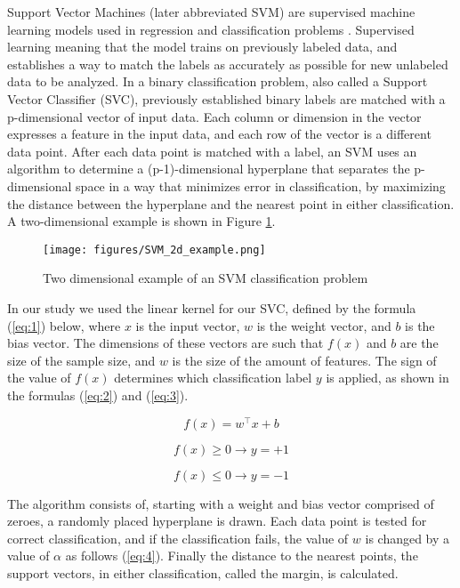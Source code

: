 \documentclass[review]{elsarticle}
\begin{document}
Support Vector Machines (later abbreviated SVM) are supervised machine learning models used in regression and classification problems \cite{35}. Supervised learning meaning that the model trains on previously labeled data, and establishes a way to match the labels as accurately as possible for new unlabeled data to be analyzed. In a binary classification problem, also called a Support Vector Classifier (SVC), previously established binary labels are matched with a p-dimensional vector of input data. Each column or dimension in the vector expresses a feature in the input data, and each row of the vector is a different data point. After each data point is matched with a label, an SVM uses an algorithm to determine a (p-1)-dimensional hyperplane that separates the p-dimensional space in a way that minimizes error in classification, by maximizing the distance between the hyperplane and the nearest point in either classification. A two-dimensional example is shown in Figure \ref{fig:svm}.

\begin{figure}
\centering
\texttt{[image: figures/SVM\_2d\_example.png]}
\caption{Two dimensional example of an SVM classification problem}
\label{fig:svm}
\end{figure}

In our study we used the linear kernel for our SVC, defined by the formula (\ref{eq:1}) below, where \(x\) is the input vector, \(w\) is the weight vector, and \(b\) is the bias vector. The dimensions of these vectors are such that \(f(x)\) and \(b\) are the size of the sample size, and \(w\) is the size of the amount of features. The sign of the value of \(f(x)\) determines which classification label \(y\) is applied, as shown in the formulas (\ref{eq:2}) and (\ref{eq:3}). 

\begin{equation}\label{eq:1}
f(x) = w^\top x + b
\end{equation}

\begin{equation}\label{eq:2}
f(x)\geq 0 \rightarrow y= +1 
\end{equation}

\begin{equation}\label{eq:3}
f(x)\leq 0 \rightarrow y= -1 
\end{equation}

The algorithm consists of, starting with a weight and bias vector comprised of zeroes, a randomly placed hyperplane is drawn. Each data point is tested for correct classification, and if the classification fails, the value of \(w\) is changed by a value of \(\alpha\) as follows (\ref{eq:4}). Finally the distance to the nearest points, the support vectors, in either classification, called the margin, is calculated.
\end{document}
